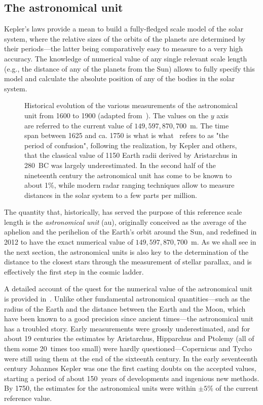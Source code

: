 \subsection{The astronomical unit}
\label{sec:astronomical_unit}

Kepler's laws provide a mean to build a fully-fledged scale model of the solar system,
where the relative sizes of the orbits of the planets are determined by their
periods---the latter being comparatively easy to measure to a very high accuracy.
The knowledge of numerical value of any single relevant scale length (e.g., the
distance of any of the planets from the Sun) allows to fully specify this
model and calculate the absolute position of any of the bodies in the solar system.

\begin{figure}[htbp!]
	
	\caption{Historical evolution of the various measurements of the astronomical
  unit from 1600 to 1900 (adapted from~\cite{2001JAHH....4...15H}). The values
  on the $y$ axis are referred to the current value of $149,597,870,700$~m.
  The time span between 1625 and ca. 1750 is what is what~\cite{2001JAHH....4...15H}
  refers to as "the period of confusion", following the realization, by Kepler
  and others, that the classical value of 1150 Earth radii derived by Aristarchus
  in 280~BC was largely underestimated. In the second half of the nineteenth
  century the astronomical unit has come to be known to about 1\%, while
  modern radar ranging techniques allow to measure distances in the solar
  system to a few parts per million.}
\end{figure}

The quantity that, historically, has served the purpose of this reference scale
length is the \emph{astronomical unit} (au), originally conceived as the average
of the aphelion and the perihelion of the Earth's orbit around the Sun, and redefined
in 2012 to have the exact numerical value of $149,597,870,700$~m. As we shall see
in the next section, the astronomical units is also key to the determination of
the distance to the closest stars through the measurement of stellar parallax, and
is effectively the first step in the cosmic ladder.

A detailed account of the quest for the numerical value of the astronomical unit
is provided in~\cite{2001JAHH....4...15H}. Unlike other fundamental astronomical
quantities---such as the radius of the Earth and the distance between the Earth
and the Moon, which have been known to a good precision since ancient times---the
astronomical unit has a troubled story. Early measurements were grossly underestimated,
and for about 19 centuries the estimates by Aristarchus, Hipparchus and Ptolemy
(all of them some 20~times too small) were hardly questioned---Copernicus and Tycho
were still using them at the end of the sixteenth century. In the early seventeenth
century Johannes Kepler was one the first casting doubts on the accepted values,
starting a period of about 150~years of developments and ingenious new methods.
By 1750, the estimates for the astronomical units were within $\pm 5\%$ of the current
reference value.



